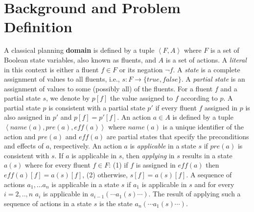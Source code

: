 \documentclass[letterpaper]{article} %
\newcommand{\tuple}[1]{\ensuremath{\left \langle #1 \right \rangle }}
\newcommand{\pre}{\textit{pre}}
\newcommand{\eff}{\textit{eff}}
\newcommand{\name}{\textit{name}}
\newcommand{\true}{\textit{true}}
\newcommand{\false}{\textit{false}}
\newcommand{\roni}[1]{{\textcolor{green}{[Roni: #1]}}}
\begin{document}

\section{Background and Problem Definition} 

A classical planning \textbf{domain} is defined by a tuple 
$\tuple{F,A}$ where $F$ is a set of Boolean state variables, also known as fluents, 
and $A$ is a set of actions. A \emph{literal} in this context is either a fluent $f\in F$ or its negation $\neg f$.  
A \emph{state} is a complete assignment of values to all fluents, i.e., $s:F\rightarrow\{\true, \false\}$. 
A \emph{partial state} is an assignment of values to some (possibly all) of the fluents. 
For a fluent $f$ and a partial state $s$, we denote by $p[f]$ the value assigned to $f$ according to $p$. 
A partial state $p$ is consistent with a partial state $p'$
if every fluent $f$ assigned in $p$ is also assigned in $p'$ 
and $p[f]=p'[f]$. 
An action $a\in A$ is defined by a tuple $\tuple{\name(a), \pre(a), \eff(a)}$ where 
$\name(a)$ is a unique identifier of the action
and $\pre(a)$ and $\eff(a)$ are partial states that specify the preconditions and effects of $a$, respectively. 
An action $a$ is \emph{applicable} in a state $s$ if $\pre(a)$ is consistent with $s$. 
If $a$ is applicable in $s$, then \emph{applying} in $s$ results in a state $a(s)$ where
for every fluent $f \in F$: 
(1) if $f$ is assigned in $\eff(a)$ then $\eff(a)[f]=a(s)[f]$, 
(2) otherwise, $s[f]=a(s)[f]$. 
A sequence of actions $a_1,\ldots a_n$ is applicable in a state $s$ if 
$a_1$ is applicable in $s$ and for every $i=2,..,n$ 
$a_i$ is applicable in $a_{i-1}(\cdots a_1(s)\cdots)$. 
The result of applying such a sequence of actions in a state $s$ is 
the state $a_n(\cdots a_1(s)\cdots)$. 
\end{document}
